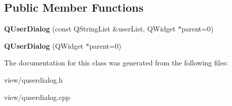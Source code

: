 \subsection*{Public Member Functions}
\begin{DoxyCompactItemize}
\item 
\hypertarget{classQUserDialog_a120f5381a4a037acb2de11a49aa46e3e}{{\bfseries Q\+User\+Dialog} (const Q\+String\+List \&user\+List, Q\+Widget $\ast$parent=0)}\label{classQUserDialog_a120f5381a4a037acb2de11a49aa46e3e}

\item 
\hypertarget{classQUserDialog_ae1cff90bf82a90ad1f11947a59f02e82}{{\bfseries Q\+User\+Dialog} (Q\+Widget $\ast$parent=0)}\label{classQUserDialog_ae1cff90bf82a90ad1f11947a59f02e82}

\end{DoxyCompactItemize}


The documentation for this class was generated from the following files\+:\begin{DoxyCompactItemize}
\item 
view/quserdialog.\+h\item 
view/quserdialog.\+cpp\end{DoxyCompactItemize}
